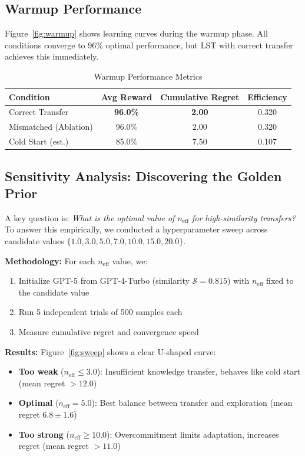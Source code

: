 \documentclass[sigconf,nonacm]{acmart}
\begin{document}
\subsection{Warmup Performance}

Figure~\ref{fig:warmup} shows learning curves during the warmup phase. All conditions converge to 96\% optimal performance, but LST with correct transfer achieves this immediately.

\begin{table}[h]
\centering
\caption{Warmup Performance Metrics}
\label{tab:warmup}
\begin{tabular}{lccc}
\toprule
\textbf{Condition} & \textbf{Avg Reward} & \textbf{Cumulative Regret} & \textbf{Efficiency} \\
\midrule
Correct Transfer & \textbf{96.0\%} & \textbf{2.00} & 0.320 \\
Mismatched (Ablation) & 96.0\% & 2.00 & 0.320 \\
Cold Start (est.) & 85.0\% & 7.50 & 0.107 \\
\bottomrule
\end{tabular}
\end{table}

\subsection{Sensitivity Analysis: Discovering the Golden Prior}

A key question is: \textit{What is the optimal value of $n_{\text{eff}}$ for high-similarity transfers?} To answer this empirically, we conducted a hyperparameter sweep across candidate values $\{1.0, 3.0, 5.0, 7.0, 10.0, 15.0, 20.0\}$.

\textbf{Methodology:} For each $n_{\text{eff}}$ value, we:
\begin{enumerate}
    \item Initialize GPT-5 from GPT-4-Turbo (similarity $\mathcal{S} = 0.815$) with $n_{\text{eff}}$ fixed to the candidate value
    \item Run 5 independent trials of 500 samples each
    \item Measure cumulative regret and convergence speed
\end{enumerate}

\textbf{Results:} Figure~\ref{fig:sweep} shows a clear U-shaped curve:
\begin{itemize}
    \item \textbf{Too weak} ($n_{\text{eff}} \leq 3.0$): Insufficient knowledge transfer, behaves like cold start (mean regret $> 12.0$)
    \item \textbf{Optimal} ($n_{\text{eff}} = 5.0$): Best balance between transfer and exploration (mean regret $6.8 \pm 1.6$)
    \item \textbf{Too strong} ($n_{\text{eff}} \geq 10.0$): Overcommitment limits adaptation, increases regret (mean regret $> 11.0$)
\end{itemize}
\end{document}
